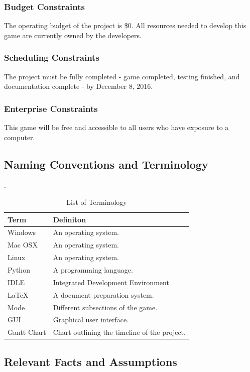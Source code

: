 \documentclass[12pt, titlepage]{article}
\begin{document}
\subsubsection{Budget Constraints}
The operating budget of the project is \$0. All resources needed to develop this game are currently owned by the developers.

\subsubsection{Scheduling Constraints}
The project must be fully completed - game completed, testing finished, and documentation complete - by December 8, 2016.

\subsubsection{Enterprise Constraints}
This game will be free and accessible to all users who have exposure to a computer. 

\subsection{Naming Conventions and Terminology}
.
\begin{table}[h!]
	\centering
	\caption{List of Terminology}
	\label{tab:table3}
	\begin{tabular}{ll}
		\hline
		Term & Definiton\\
		\hline
		Windows & An operating system.\\
		Mac OSX & An operating system.\\
		Linux & An operating system.\\
		Python & A programming language.\\
		IDLE & Integrated Development Environment\\
		LaTeX & A document preparation system. \\
		Mode & Different subsections of the game.\\
		GUI & Graphical user interface.\\
		Gantt Chart &Chart outlining the timeline of the project.\\
		\hline
	\end{tabular}
\end{table}

\subsection{Relevant Facts and Assumptions}
\end{document}
